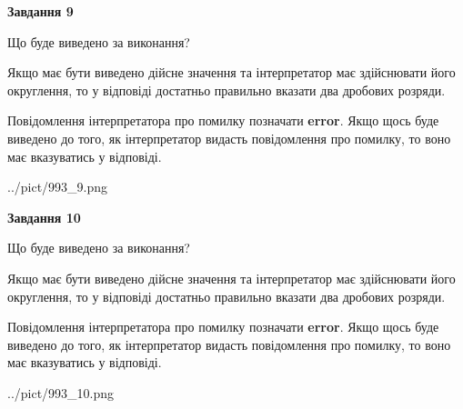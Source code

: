 \documentclass[12pt, ukrainian]{article}
\begin{document}
{\begin {Large}
{\begin {center}\textbf{Завдання 9}\end {center}}\par
Що буде виведено за виконання? \par

Якщо має бути виведено дійсне значення та інтерпретатор має здійснювати його округлення, 
то у відповіді достатньо правильно вказати два дробових розряди.

Повідомлення інтерпретатора про помилку позначати \textbf{error}.
Якщо щось буде виведено до того, як інтерпретатор видасть повідомлення про помилку, 
то воно має вказуватись у відповіді. \par

\begin{center}
	{../pict/993_9.png}
\end{center}
\newpage

{\begin {center}\textbf{Завдання 10}\end {center}}\par
Що буде виведено за виконання? \par

Якщо має бути виведено дійсне значення та інтерпретатор має здійснювати його округлення, 
то у відповіді достатньо правильно вказати два дробових розряди.

Повідомлення інтерпретатора про помилку позначати \textbf{error}.
Якщо щось буде виведено до того, як інтерпретатор видасть повідомлення про помилку, 
то воно має вказуватись у відповіді. \par

\begin{center}
	{../pict/993_10.png}
\end{center}
\newpage

\end {Large}}
\end{document}
